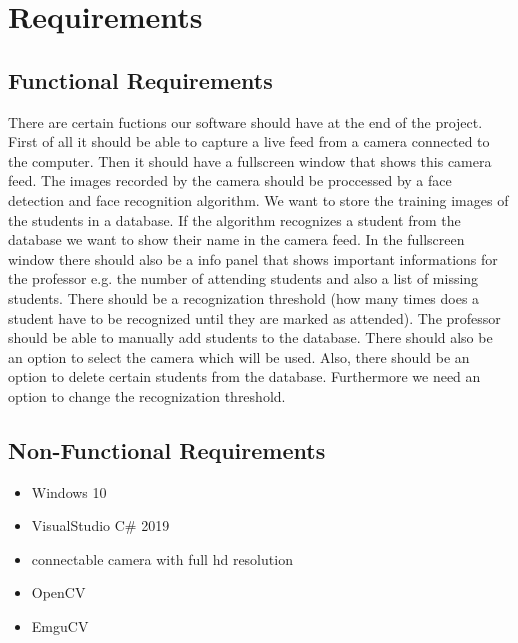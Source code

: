 \documentclass[12pt, a4paper]{article}
\begin{document}
\newpage



\section{Requirements}
\subsection{Functional Requirements}
There are certain fuctions our software should have at the end of the project. First of all it should be able to capture a live feed from a camera connected to the computer. Then it should have a fullscreen window that shows this camera feed. The images recorded by the camera should be proccessed by a face detection and face recognition algorithm. We want to store the training images of the students in a database. If the algorithm recognizes a student from the database we want to show their name in the camera feed. In the fullscreen window there should also be a info panel that shows important informations for the professor e.g. the number of attending students and also a list of missing students. There should be a recognization threshold (how many times does a student have to be recognized until they are marked as attended). The professor should be able to manually add students to the database. There should also be an option to select the camera which will be used. Also, there should be an option to delete certain students from the database. Furthermore we need an option to change the recognization threshold. 

\subsection{Non-Functional Requirements}
\begin{itemize}
\item Windows 10
\item VisualStudio C\# 2019
\item connectable camera with full hd resolution
\item OpenCV
\item EmguCV
\end{itemize}



\newpage
\end{document}
